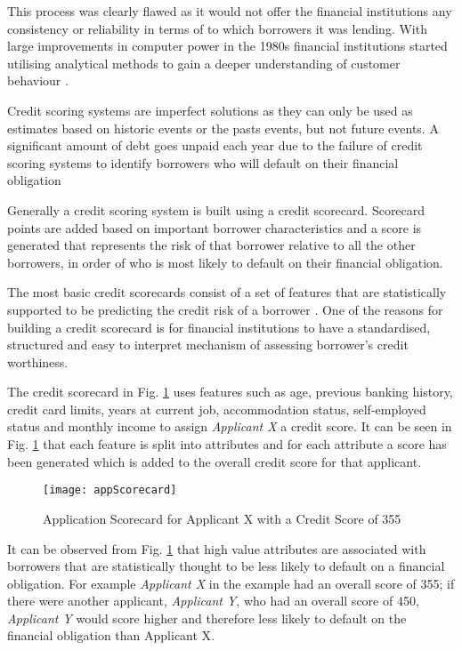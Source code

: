This process was clearly flawed as it would not offer the financial institutions any consistency or reliability in terms of to which borrowers it was lending. With large improvements in computer power in the 1980s financial institutions started utilising analytical methods to gain a deeper understanding of customer behaviour \citep{hand_modelling_2001}.

Credit scoring systems are imperfect solutions as they can only be used as estimates based on historic events or the pasts events, but not future events. A significant amount of debt goes unpaid each year due to the failure of credit scoring systems to identify borrowers who will default on their financial obligation \citep{finlay_multiple_2011}

Generally a credit scoring system is built using a credit scorecard. Scorecard points are added based on important borrower characteristics and a score is generated that represents the risk of that borrower relative to all the other borrowers, in order of who is most likely to default on their financial obligation.

The most basic credit scorecards consist of a set of features that are statistically supported to be predicting the credit risk of a borrower \citep{siddiqi_credit_2012}. One of the reasons for building a credit scorecard is for financial institutions to have a standardised, structured and easy to interpret mechanism of assessing borrower's credit worthiness.
 
The credit scorecard in Fig. \ref{fig:appScorecard} uses features such as age, previous banking history, credit card limits, years at current job, accommodation status, self-employed status and monthly income to assign \textit{Applicant X} a credit score. It can be seen in Fig. \ref{fig:appScorecard} that each feature is split into attributes and for each attribute a score has been generated which is added to the overall credit score for that applicant. 

\begin{figure}[H]
	\texttt{[image: appScorecard]}
	\caption{Application Scorecard for Applicant X with a Credit Score of 355	
	}
	\label{fig:appScorecard}
\end{figure}

It can be observed from Fig. \ref{fig:appScorecard} that high value attributes are associated with borrowers that are statistically thought to be less likely to default on a financial obligation. For example \textit{Applicant X} in the example had an overall score of 355; if there were another applicant, \textit{Applicant Y}, who had an overall score of 450, \textit{Applicant Y} would score higher and therefore less likely to default on the financial obligation than {Applicant X}.

